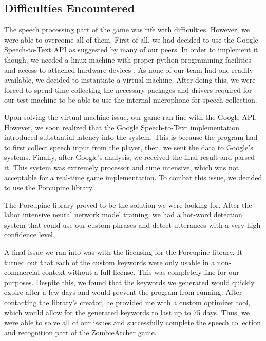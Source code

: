 \documentclass[titlepage, 12pt]{scrartcl}
\begin{document}
    \subsection{Difficulties Encountered}
        The speech processing part of the game was rife with difficulties. However, we were able to overcome all of them. First of all, we had decided to use the Google Speech-to-Text API as suggested by many of our peers. In order to implement it though, we needed a linux machine with proper python programming facilities and access to attached hardware devices \cite{ishant_2013}. As none of our team had one readily available, we decided to instantiate a virtual machine. After doing this, we were forced to spend time collecting the necessary packages and drivers required for our test machine to be able to use the internal microphone for speech collection. \par
        Upon solving the virtual machine issue, our game ran fine with the Google API. However, we soon realized that the Google Speech-to-Text implementation introduced substantial latency into the system. This is because the program had to first collect speech input from the player, then, we sent the data to Google's systems. Finally, after Google's analysis, we received the final result and parsed it. This system was extremely processor and time intensive, which was not acceptable for a real-time game implementation. To combat this issue, we decided to use the Porcupine library. \par
        The Porcupine library proved to be the solution we were looking for. After the labor intensive neural network model training, we had a hot-word detection system that could use our custom phrases and detect utterances with a very high confidence level. \par
        A final issue we ran into was with the licensing for the Porcupine library. It turned out that each of the custom keywords were only usable in a non-commercial context without a full license. This was completely fine for our purposes. Despite this, we found that the keywords we generated would quickly expire after a few days and would prevent the program from running. After contacting the library's creator, he provided me with a custom optimizer tool, which would allow for the generated keywords to last up to 75 days. Thus, we were able to solve all of our issues and successfully complete the speech collection and recognition part of the ZombieArcher game. \par
\end{document}
